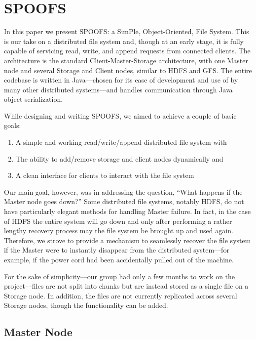 \section{SPOOFS}
\label{sec:spoofs}

In this paper we present SPOOFS: a SimPle, Object-Oriented, File System. This is our take on a distributed file system and, though at an early stage, it is fully capable of servicing read, write, and append requests from connected clients. The architecture is the standard Client-Master-Storage architecture, with one Master node and several Storage and Client nodes, similar to HDFS and GFS. The entire codebase is written in Java---chosen for its ease of development and use of by many other distributed systems---and handles communication through Java object serialization.

While designing and writing SPOOFS, we aimed to achieve a couple of basic goals:
\begin{enumerate}
\item A simple and working read/write/append distributed file system with
\item The ability to add/remove storage and client nodes dynamically and
\item A clean interface for clients to interact with the file system
\end{enumerate}
Our main goal, however, was in addressing the question, ``What happens if the Master node goes down?'' Some distributed file systems, notably HDFS, do not have particularly elegant methods for handling Master failure. In fact, in the case of HDFS the entire system will go down and only after performing a rather lengthy recovery process may the file system be brought up and used again. Therefore, we strove to provide a mechanism to seamlessly recover the file system if the Master were to instantly disappear from the distributed system---for example, if the power cord had been accidentally pulled out of the machine.

For the sake of simplicity---our group had only a few months to work on the project---files are not split into chunks but are instead stored as a single file on a Storage node. In addition, the files are not currently replicated across several Storage nodes, though the functionality can be added. 


\subsection{Master Node}

